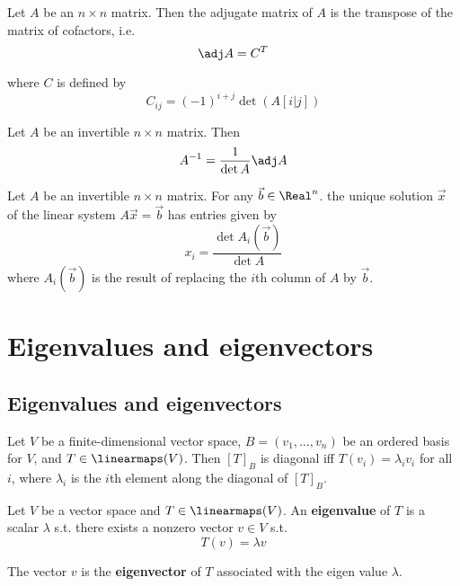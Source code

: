 \begin{definition}
  Let $A$ be an $n \times n$ matrix. Then the adjugate matrix of $A$ is the transpose of the matrix of cofactors, i.e.
  \[
    \adj A = C^T
  \]

  where $C$ is defined by
  \[
    C_{ij} = (-1)^{i + j} \det(A[i|j])
  \]
\end{definition}

\begin{lemma}
  Let $A$ be an invertible $n \times n$ matrix. Then
  \[
    A^{-1} = \frac{1}{\det A} \adj A
  \]
\end{lemma}

\begin{theorem}
  Let $A$ be an invertible $n \times n$ matrix. For any $\vec{b} \in \Real^n$. the unique solution $\vec{x}$ of the linear system $A\vec{x} = \vec{b}$ has entries given by
  \[
    x_i = \frac{\det A_i(\vec{b})}{\det A}
  \]
  where $A_i(\vec{b})$ is the result of replacing the $i$th column of $A$ by $\vec{b}$.
\end{theorem}

\section{Eigenvalues and eigenvectors}

\subsection{Eigenvalues and eigenvectors}

\begin{theorem}
  Let $V$ be a finite-dimensional vector space, $B = (v_1, \ldots, v_n)$ be an ordered basis for $V$, and $T \in \linearmaps(V)$. Then $[T]_B$ is diagonal iff $T(v_i) = \lambda_i v_i$ for all $i$, where $\lambda_i$ is the $i$th element along the diagonal of $[T]_B$.
\end{theorem}

\begin{definition}
  Let $V$ be a vector space and $T \in \linearmaps(V)$. An \textbf{eigenvalue} of $T$ is a scalar $\lambda$ s.t. there exists a nonzero vector $v \in V$ s.t.
  \[
    T(v) = \lambda v
  \]

  The vector $v$ is the \textbf{eigenvector} of $T$ associated with the eigen value $\lambda$.
\end{definition}


